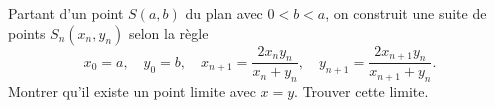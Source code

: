 Partant d'un point $S(a, b)$ du plan avec $0 < b < a$, on construit une suite de points $S_n(x_n, y_n)$ selon la règle
\[ x_0 = a,\quad y_0 = b,\quad x_{n+1} = \frac{2x_ny_n}{x_n + y_n},\quad y_{n+1} = \frac{2x_{n+1}y_n}{x_{n+1} + y_n}. \]
Montrer qu'il existe un point limite avec $x = y$. Trouver cette limite.
